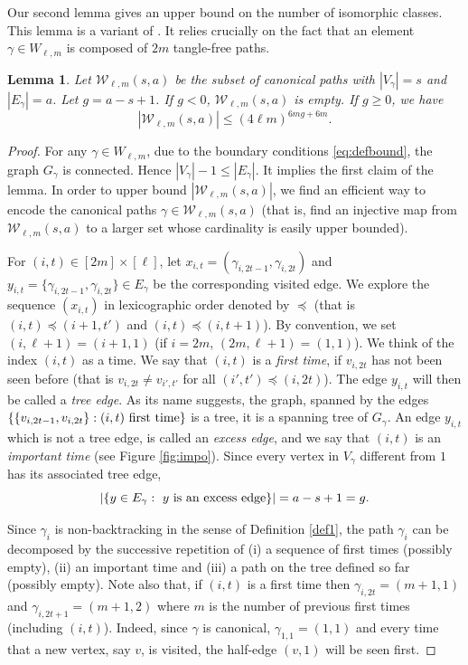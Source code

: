 \documentclass[11pt]{article}
\newtheorem{lemma}{Lemma}
\newcommand{\cE}{E}
\newcommand{\cW}{\mathcal {W}}
\newcommand{\ABS}[1]{{{\left| #1 \right|}}} %
\newcommand{\BRA}[1]{{{\left\{#1\right\}}}}
\newcommand{\1}{1\!\!{\sf I}}\newcommand{\IND}{\1}
\begin{document}
Our second lemma gives an  upper bound on the number of isomorphic classes. This lemma is  a variant of \cite[Lemma 17]{BLM}. It relies crucially on the fact that an element $\gamma \in W_{\ell,m}$ is composed of $2m$ tangle-free paths.  

\begin{lemma}\label{le:enumpath}
Let $\cW_{\ell,m} (s,a) $ be the subset of canonical paths with $|V_\gamma| = s$ and $|\cE_\gamma |= a$. Let $g = a - s +1$. If $g <0$, $\cW_{\ell,m} (s,a)$ is empty. If $g \geq 0$, we have 
$$
| \cW _{\ell,m} (s,a) | \leq   (4 \ell  m )^{6 m g  + 6 m}.
$$
\end{lemma}

\begin{proof}
For any $\gamma \in W_{\ell,m}$, due to the boundary conditions \eqref{eq:defbound}, the graph $G_\gamma$ is connected. Hence $ |V_\gamma| - 1 \leq |\cE_\gamma |$. It implies the first claim of the lemma.   In order to upper bound $| \cW_{\ell,m} ( s, a) | $, we find an efficient way  to encode the canonical paths $\gamma \in \cW_{\ell,m} ( s, a) $ (that is, find an injective map from $\cW_{\ell,m}(s,a)$ to a larger set whose cardinality is easily upper bounded). 


For $(i,t) \in [2m]\times [\ell]$, let $x_{i,t} = ( \gamma_{i,2t-1}, \gamma_{i,2t} )$ and $y_{i,t} =  \{ \gamma_{i,2t-1}, \gamma_{i,2t} \} \in \cE_\gamma$ be the corresponding visited edge. We explore the sequence $(x_{i,t})$ in lexicographic order denoted by $\preceq$ (that is $(i,t)\preceq (i+1,t')$ and $(i,t)\preceq(i,t+1)$). By convention, we set $(i,\ell+1) = (i+1, 1)$ (if $i = 2m$, $(2m,\ell+1) = (1,1)$). We think of the index $(i,t)$ as a time.  We say that $(i ,t)$ is a {\em first time}, if $v_{i,2t}$ has not been seen before (that is $v_{i,2t} \ne v_{i', t'}$ for all $(i',t') \preceq (i,2t)$). The edge $y_{i,t}$ will then be called a {\em tree edge}. As its name suggests, the graph,  spanned by the  edges $ \{ \{ v_{i,2t-1}, v_{i,2t} \} : (i,t) \hbox{ first time}\}$ is a tree, it is a spanning tree of $G_\gamma$. An edge  $y_{i,t}$ which is not a tree edge, is called an {\em excess edge}, and  we say that $(i,t)$ is an {\em important time} (see Figure \ref{fig:impo}). Since every vertex in $V_\gamma$ different from $1$ has its associated tree edge,
\begin{equation}\label{eq:defchi}
\ABS{ \BRA{ y \in \cE_\gamma : \hbox{ $y$ is an excess edge}} } = a - s +1 = g.
\end{equation}

 Since $\gamma_i$ is non-backtracking in the sense of Definition \ref{def1}, the path $\gamma_i$ can be decomposed by the successive repetition of (i) a sequence of first times (possibly empty), (ii) an important time and (iii) a path on the tree defined so far (possibly empty). Note also that, if $(i,t)$ is a first time then  $\gamma_{i,2t} = ( m +1 , 1)$ and  $\gamma_{i,2t+1} = ( m +1 , 2)$ where $m$ is the number of previous first times (including $(i,t)$). Indeed, since $\gamma$ is canonical, $\gamma_{1,1} = (1,1)$ and every time that a new vertex, say $v$, is visited, the half-edge $(v,1)$ will be seen first.


\end{proof}
\end{document}
